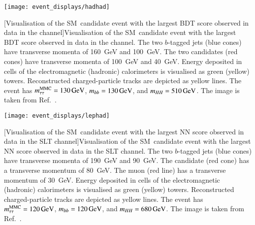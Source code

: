 {
  \centering

  \vspace*{0.2em}

  \texttt{[image: event\_displays/hadhad]}

  [Visualisation of the SM~\HH candidate event with the
  largest BDT score observed in data in the \hadhad channel]{Visualisation of
    the SM~\HH candidate event with the largest BDT score observed in data in
    the \hadhad channel. The two $b$-tagged jets (blue cones) have transverse
    momenta of \SI{160}{\GeV} and \SI{100}{\GeV}. The two \tauhadvis candidates
    (red cones) have transverse momenta of \SI{100}{\GeV} and
    \SI{40}{\GeV}. Energy deposited in cells of the electromagnetic (hadronic)
    calorimeters is visualised as green (yellow) towers. Reconstructed
    charged-particle tracks are depicted as yellow lines. The event has
    $m_{\tau\tau}^\text{MMC} = \SI{130}{\ensuremath{\text{GeV}}}$, $\mBB = \SI{130}{\GeV}$, and
    $m_{HH} = \SI{510}{\ensuremath{\text{GeV}}}$. The image is taken from Ref.~\cite{HDBS-2018-40}.}%
  \label{fig:event_display_hadhad}
}

{
  \centering

  \null\vfill

  \texttt{[image: event\_displays/lephad]}

  [Visualisation of the SM~\HH candidate event with the
  largest NN score observed in data in the \lephad SLT channel]{Visualisation
    of the SM~\HH candidate event with the largest NN score observed in data in
    the \lephad SLT channel. The two $b$-tagged jets (blue cones) have
    transverse momenta of \SI{190}{\GeV} and \SI{90}{\GeV}. The \tauhadvis
    candidate (red cone) has a transverse momentum of \SI{80}{\GeV}. The muon
    (red line) has a transverse momentum of \SI{30}{\GeV}. Energy deposited in
    cells of the electromagnetic (hadronic) calorimeters is visualised as green
    (yellow) towers. Reconstructed charged-particle tracks are depicted as
    yellow lines. The event has $m_{\tau\tau}^\text{MMC} = \SI{120}{\ensuremath{\text{GeV}}}$,
    $\mBB = \SI{120}{\GeV}$, and $m_{HH} = \SI{680}{\ensuremath{\text{GeV}}}$. The image is taken
    from Ref.~\cite{HDBS-2018-40}.}%
  \label{fig:event_display_lephad}

  \null\vfill
}

